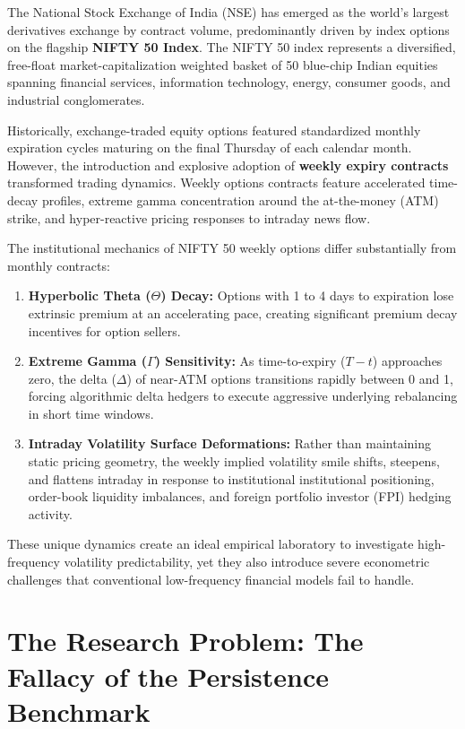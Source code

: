 The National Stock Exchange of India (NSE) has emerged as the world's largest derivatives exchange by contract volume, predominantly driven by index options on the flagship \textbf{NIFTY 50 Index}. The NIFTY 50 index represents a diversified, free-float market-capitalization weighted basket of 50 blue-chip Indian equities spanning financial services, information technology, energy, consumer goods, and industrial conglomerates.

Historically, exchange-traded equity options featured standardized monthly expiration cycles maturing on the final Thursday of each calendar month. However, the introduction and explosive adoption of \textbf{weekly expiry contracts} transformed trading dynamics. Weekly options contracts feature accelerated time-decay profiles, extreme gamma concentration around the at-the-money (ATM) strike, and hyper-reactive pricing responses to intraday news flow. 

The institutional mechanics of NIFTY 50 weekly options differ substantially from monthly contracts:
\begin{enumerate}
    \item \textbf{Hyperbolic Theta ($\Theta$) Decay:} Options with 1 to 4 days to expiration lose extrinsic premium at an accelerating pace, creating significant premium decay incentives for option sellers.
    \item \textbf{Extreme Gamma ($\Gamma$) Sensitivity:} As time-to-expiry ($T-t$) approaches zero, the delta ($\Delta$) of near-ATM options transitions rapidly between 0 and 1, forcing algorithmic delta hedgers to execute aggressive underlying rebalancing in short time windows.
    \item \textbf{Intraday Volatility Surface Deformations:} Rather than maintaining static pricing geometry, the weekly implied volatility smile shifts, steepens, and flattens intraday in response to institutional institutional positioning, order-book liquidity imbalances, and foreign portfolio investor (FPI) hedging activity.
\end{enumerate}

These unique dynamics create an ideal empirical laboratory to investigate high-frequency volatility predictability, yet they also introduce severe econometric challenges that conventional low-frequency financial models fail to handle.

\section{The Research Problem: The Fallacy of the Persistence Benchmark}
\label{sec:research_problem}


